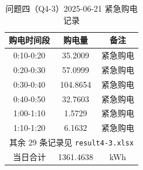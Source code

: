 \begin{table}[htbp]
\centering
\caption{问题四（Q4-3）2025-06-21 紧急购电记录}\label{tab:q4-3-emergency}
\normalsize\setlength{\tabcolsep}{6pt}
\begin{tabular}{@{}ccc@{}}
\toprule
购电时间段 & 购电量 & 备注 \\
\midrule
0:10-0:20 & 35.2009 & 紧急购电 \\
0:20-0:30 & 57.0999 & 紧急购电 \\
0:30-0:40 & 104.8654 & 紧急购电 \\
0:40-0:50 & 32.7603 & 紧急购电 \\
1:00-1:10 & 1.5729 & 紧急购电 \\
1:10-1:20 & 6.1632 & 紧急购电 \\
\multicolumn{3}{c}{其余 29 条记录见 \texttt{result4-3.xlsx}} \\
\midrule
当日合计 & 1361.4638 & kWh \\
\bottomrule
\end{tabular}
\end{table}

